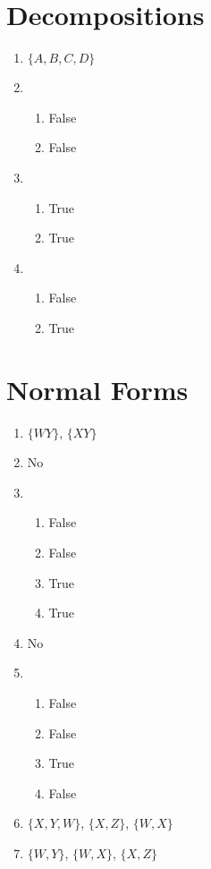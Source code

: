 \documentclass{homework}
\begin{document}
\section{Decompositions}

\begin{enumerate}
    \item $\{A, B, C, D\}$
    \item \begin{enumerate}
        \item False
        \item False
    \end{enumerate}
    \item \begin{enumerate}
        \item True
        \item True
    \end{enumerate}
    \item \begin{enumerate}
        \item False
        \item True
    \end{enumerate}
\end{enumerate}

\section{Normal Forms}

\begin{enumerate}
    \item $\{WY\}$, $\{XY\}$
    \item No
    \item \begin{enumerate}
        \item False
        \item False
        \item True
        \item True
    \end{enumerate}
    \item No
    \item \begin{enumerate}
        \item False
        \item False
        \item True
        \item False
    \end{enumerate}
    \item $\{X, Y, W\}$, $\{X, Z\}$, $\{W, X\}$
    \item $\{W, Y\}$, $\{W, X\}$, $\{X, Z\}$
\end{enumerate}
\end{document}
